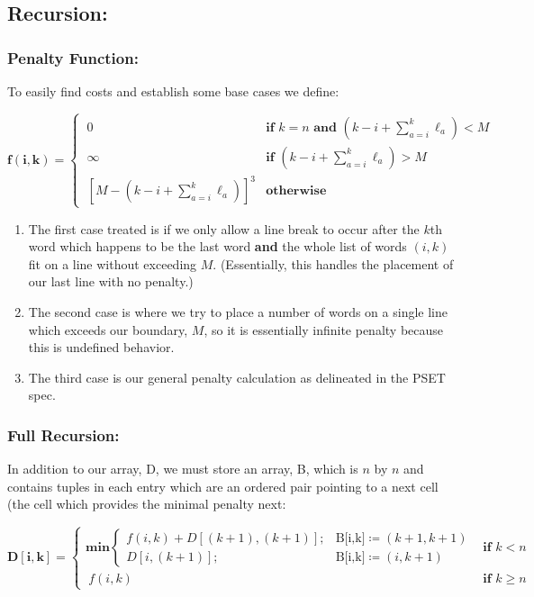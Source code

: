 \documentclass[conference]{styles/acmsiggraph}
\newcommand{\?}{\stackrel{?}{=}}
\begin{document}
\subsection{Recursion:}
\subsubsection{Penalty Function:} \label{penaltyfunc}
To easily find costs and establish some base cases we define:

$$\mathbf{f(i,k)}=\begin{cases}
   \ 0 & \textbf{if } k=n \textbf{ and } (k-i + \sum^{k}_{a = i} \ell_a) < M  \\
    \ \infty & \textbf{if } (k-i + \sum^{k}_{a = i} \ell_a) > M \\
    \ [M-(k-i + \sum^{k}_{a = i} \ell_a)]^3 & \textbf{otherwise}
\end{cases}$$

\begin{enumerate}
    \item The first case treated is if we only allow a line break to occur after the $k$th word which happens to be the last word \textbf{and} the whole list of words $(i,k)$ fit on a line without exceeding $M$.  (Essentially, this handles the placement of our last line with no penalty.)
    \item The second case is where we try to place a number of words on a single line which exceeds our boundary, $M$, so it is essentially infinite penalty because this is undefined behavior.
    \item The third case is our general penalty calculation as delineated in the PSET spec.\\
\end{enumerate}


\subsubsection{Full Recursion:} \label{4func}
In addition to our array, D, we must store an array, B, which is $n$ by $n$ and contains tuples in each entry which are an ordered pair pointing to a next cell (the cell which provides the minimal penalty next:

$$\mathbf{D[i,k]}=\begin{cases}
    \textbf{min}
    \begin{cases}
        f(i,k) + D[(k+1), (k+1)]; & \text{B[i,k]} \coloneq (k+1, k+1) \\
        D[i,(k+1)]; & \text{B[i,k]} \coloneq (i, k+1)
    \end{cases}  & \textbf{if } k<n \\
    \ f(i,k) & \textbf{if } k \geq n
\end{cases}$$
\end{document}
